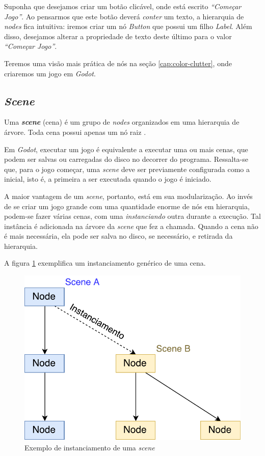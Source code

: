 Suponha que desejamos criar um botão clicável, onde está escrito \textit{``Começar Jogo''}. Ao pensarmos que este botão deverá \emph{conter} um texto, a hierarquia de \textit{nodes} fica intuitiva: iremos criar um nó \textit{Button} que possui um filho \textit{Label}. Além disso, desejamos alterar a propriedade de texto deste último para o valor \textit{``Começar Jogo''}.

Teremos uma visão mais prática de nós na seção \ref{cap:color-clutter}, onde criaremos um jogo em \textit{Godot}.


\subsection{\textit{Scene}}

Uma \textbf{\textit{scene}} (cena) é um grupo de \textit{nodes} organizados em uma hierarquia de árvore. Toda cena possui apenas um nó raiz \citep{godotScene}.

Em \textit{Godot}, executar um jogo é equivalente a executar uma ou mais cenas, que podem ser salvas ou carregadas do disco no decorrer do programa. Ressalta-se que, para o jogo começar, uma \textit{scene} deve ser previamente configurada como a inicial, isto é, a primeira a ser executada quando o jogo é iniciado.

A maior vantagem de um \textit{scene}, portanto, está em sua modularização. Ao invés de se criar um jogo grande com uma quantidade enorme de nós em hierarquia, podem-se fazer várias cenas, com uma \emph{instanciando} outra durante a execução. Tal instância é adicionada na árvore da \textit{scene} que fez a chamada. Quando a cena não é mais necessária, ela pode ser salva no disco, se necessário, e retirada da hierarquia.

A figura \ref{sceneInstance} exemplifica um instanciamento genérico de uma cena.

\begin{figure}[H]
  \centering
  \includegraphics[width=.5\textwidth]{image/scene.pdf}
  \caption{Exemplo de instanciamento de uma \textit{scene} \citep{godotScene}}
  \label{sceneInstance}
\end{figure}

